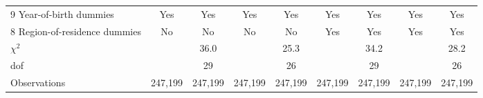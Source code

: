 {\begin{tabular}{l*{8}{c}}
\hline
9 Year-of-birth dummies        & Yes & Yes & Yes & Yes & Yes & Yes & Yes & Yes \\ 
8 Region-of-residence dummies  & No & No & No & No & Yes & Yes & Yes & Yes \\ 
$ \chi^2 $          &               &        36.0   &               &        25.3   &               &        34.2   &               &        28.2   \\
dof                 &               &          29   &               &          26   &               &          29   &               &          26   \\
Observations        &     247,199   &     247,199   &     247,199   &     247,199   &     247,199   &     247,199   &     247,199   &     247,199   \\
\hline\hline
\end{tabular}}
